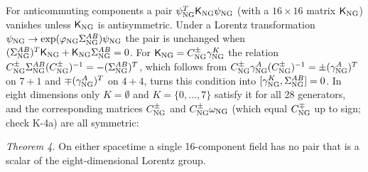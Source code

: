 For anticommuting components a pair $\psi^T_{\rm NG}\mathsf K_{\rm NG}\psi_{\rm NG}$ (with a $16\times16$ matrix
$\mathsf K_{\rm NG}$) vanishes unless $\mathsf K_{\rm NG}$ is antisymmetric. Under a Lorentz transformation
$\psi_{\rm NG}\to\exp(\varphi_{\rm NG}\Sigma^{AB}_{\rm NG})\psi_{\rm NG}$ the pair is unchanged when
$(\Sigma^{AB}_{\rm NG})^T\mathsf K_{\rm NG}+\mathsf K_{\rm NG}\Sigma^{AB}_{\rm NG}=0$. For
$\mathsf K_{\rm NG}=C^\pm_{\rm NG}\gamma^K_{\rm NG}$ the relation $C^\pm_{\rm NG}\Sigma^{AB}_{\rm NG}
(C^\pm_{\rm NG})^{-1}=-(\Sigma^{AB}_{\rm NG})^T$, which follows from $C^\pm_{\rm NG}\gamma^A_{\rm NG}
(C^\pm_{\rm NG})^{-1}=\pm(\gamma^A_{\rm NG})^T$ on $7+1$ and $\mp(\gamma^A_{\rm NG})^T$ on $4+4$, turns this
condition into $[\gamma^K_{\rm NG},\Sigma^{AB}_{\rm NG}]=0$. In eight dimensions only $K=\emptyset$ and
$K=\{0,\dots,7\}$ satisfy it for all 28 generators, and the corresponding matrices $C^\pm_{\rm NG}$ and
$C^\pm_{\rm NG}\omega_{\rm NG}$ (which equal $C^\mp_{\rm NG}$ up to sign; check K-4a) are all symmetric:

\emph{Theorem 4.} On either spacetime a single 16-component field has no pair that is a scalar of the
eight-dimensional Lorentz group.

